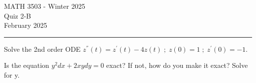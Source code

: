 \documentclass[12pt,letterpaper, onecolumn]{exam}
\begin{document}
\begingroup  
    \centering
    \LARGE MATH 3503 - Winter 2025\\
    \LARGE Quiz 2-B\\[0.5em]
    \large February 2025\\[0.5em]
\endgroup
\rule{\textwidth}{0.4pt}
\pointsdroppedatright   %
\printanswers
\renewcommand{\solutiontitle}{\noindent\textbf{Ans:}\enspace}   %

\begin{questions}
    
    \question[4 Marks] Solve the 2nd order ODE $z^{''}(t) = z^{'}(t) - 4 z(t) \; ; \; z(0) = 1 \; ; \; z^{'}(0) = -1$.\droppoints
    
    \pagebreak %
\thispagestyle{empty}   %
    
    \question[6 Marks] Is the equation $y^2 dx + 2xy dy = 0$ exact? If not, how do you make it exact? Solve for y.\droppoints
    
\end{questions}
\end{document}

